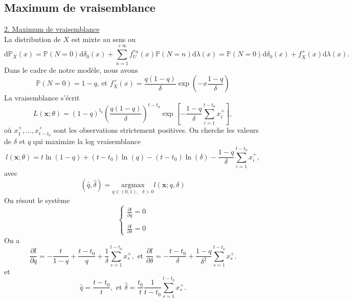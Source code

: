 \documentclass[8pt,notheorems]{beamer}
\theoremstyle{definition}
\theoremstyle{example}
\theoremstyle{mystyle}
\theoremstyle{plain}
\begin{document}
\subsection{Maximum de vraisemblance}
\begin{frame}[allowframebreaks]
\underline{2. Maximum de vraisemblance}\\
La distribution de $X$ est mixte au sens ou 
$$
\text{d}\mathbb{P}_X(x) = \mathbb{P}(N = 0)\text{d}\delta_0(x) + \sum_{n = 1}^{+\infty}f_U^{\ast n}(x)\mathbb{P}(N = n)\text{d}\lambda(x)= \mathbb{P}(N = 0)\text{d}\delta_0(x) + f^+_X(x)\text{d}\lambda(x).
$$
Dans le cadre de notre modèle, nous avons 
$$
\mathbb{P}(N = 0) = 1-q\text{, et }f^+_X(x) =\frac{q(1-q)}{\delta}\exp\left(-x\frac{1-q}{\delta}\right)
$$
La vraisemblance s'écrit
$$
L(\mathbf{x};\theta) = (1-q)^{t_0}\left(\frac{q(1-q)}{\delta}\right)^{t-t_0}\exp\left[-\frac{1-q}{\delta}\sum_{i = 1}^{t-t_0}x_i^+\right],
$$
où $x_1^+,\ldots, x_{t-t_0}^+$ sont les observations strictement positives. On cherche les valeurs de $\delta$ et $q$ qui maximize la log vraisemblance 
$$
l(\mathbf{x};\theta)=t\ln(1-q) + (t-t_0)\ln(q)-(t-t_0)\ln(\delta) -\frac{1-q}{\delta}\sum_{i = 1}^{t-t_0}x_i^+, 
$$
avec 
$$
(\widehat{q},\widehat{\delta}) = \underset{q\in(0,1),\text{ }\delta>0}{\text{argmax}} l(\mathbf{x}; q,\delta)
$$
On résout le système 
\begin{equation}\label{eq:mle_system}
\begin{cases}
\frac{\partial l}{\partial q}=0\\
\\
\frac{\partial l}{\partial \delta}=0
\end{cases}
\end{equation}
On a
$$
\frac{\partial l}{\partial q} = -\frac{t}{1-q}+\frac{t-t_0}{q}+\frac{1}{\delta}\sum_{s=1}^{t-t_0}x_{s}^+,\text{ et }\frac{\partial l}{\partial \delta} =- \frac{t-t_0}{\delta}+\frac{1-q}{\delta^2}\sum_{s=1}^{t-t_0}x_{s}^+.
$$
et 
$$
\widehat{q} = \frac{t-t_0}{t},\text{ et }\widehat{\delta} = \frac{t_0}{t}\frac{1}{t-t_0}\sum_{s=1}^{t-t_0}x_{s}^+.
$$
\end{frame}
\end{document}
